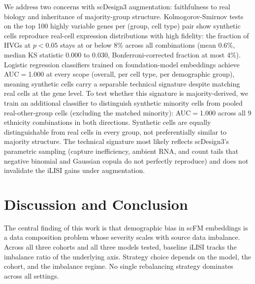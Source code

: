 \documentclass[sigconf]{acmart}
\begin{document}
We address two concerns with scDesign3 augmentation: faithfulness to real biology and inheritance of majority-group structure. Kolmogorov-Smirnov tests on the top 100 highly variable genes per (group, cell type) pair show synthetic cells reproduce real-cell expression distributions with high fidelity: the fraction of HVGs at $p < 0.05$ stays at or below 8\% across all combinations (mean 0.6\%, median KS statistic 0.000 to 0.030, Bonferroni-corrected fraction at most 4\%). Logistic regression classifiers trained on foundation-model embeddings achieve AUC$=$1.000 at every scope (overall, per cell type, per demographic group), meaning synthetic cells carry a separable technical signature despite matching real cells at the gene level. To test whether this signature is majority-derived, we train an additional classifier to distinguish synthetic minority cells from pooled real-other-group cells (excluding the matched minority): AUC$=$1.000 across all 9 ethnicity combinations in both directions. Synthetic cells are equally distinguishable from real cells in every group, not preferentially similar to majority structure. The technical signature most likely reflects scDesign3's parametric sampling (capture inefficiency, ambient RNA, and count tails that negative binomial and Gaussian copula do not perfectly reproduce) and does not invalidate the iLISI gains under augmentation.

\section{Discussion and Conclusion}

The central finding of this work is that demographic bias in scFM embeddings is a data composition problem whose severity scales with source data imbalance. Across all three cohorts and all three models tested, baseline iLISI tracks the imbalance ratio of the underlying axis. Strategy choice depends on the model, the cohort, and the imbalance regime. No single rebalancing strategy dominates across all settings.
\end{document}
